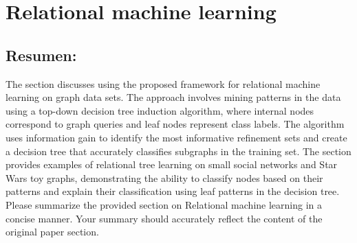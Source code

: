 \documentclass{article}%
\begin{document}
%
\clearpage%
\section{Relational machine learning}%
\label{sec:Relationalmachinelearning}%
\subsection{Resumen:}%
\label{subsec:Resumen}%
The section discusses using the proposed framework for relational machine learning on graph data sets. The approach involves mining patterns in the data using a top{-}down decision tree induction algorithm, where internal nodes correspond to graph queries and leaf nodes represent class labels. The algorithm uses information gain to identify the most informative refinement sets and create a decision tree that accurately classifies subgraphs in the training set. The section provides examples of relational tree learning on small social networks and Star Wars toy graphs, demonstrating the ability to classify nodes based on their patterns and explain their classification using leaf patterns in the decision tree.\newline%
\newline%
Please summarize the provided section on Relational machine learning in a concise manner. Your summary should accurately reflect the content of the original paper section.

%
\end{document}
